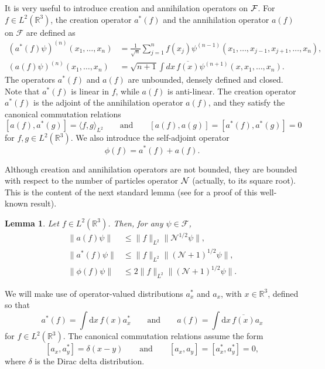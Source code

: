 \documentclass[11pt,a4paper,DIV11]{scrartcl}	%
\newtheorem{lem}[thm]{Lemma}
\newcommand{\cF}{{\cal F}}
\newcommand{\cN}{{\cal N}}
\newcommand{\R}{\mathds{R}}
\newcommand{\N}{\mathcal{N}}
\newcommand{\di}{\textrm{d}}		%
\newcommand{\Ncal}{\mathcal{N}}		%
\newcommand{\cc}[1]{\overline{#1}}	%
\newcommand{\norm}[1]{\lVert#1\rVert}	%
\begin{document}
It is very useful to introduce creation and annihilation operators on $\cF$. 
For $f \in L^2(\R^3)$, the creation operator $a^*(f)$ and the annihilation
operator $a(f)$ on $\mathcal{F}$ are defined as
\[
  \begin{split}
    (a^*(f) \psi)^{(n)}(x_1, \dots, x_n) & = \frac{1}{\sqrt{n}} \sum_{j=1}^n
    f(x_j) \psi^{(n-1)}(x_1, \dots, x_{j-1}, x_{j+1}, \dots, x_n), \\
    (a(f) \psi)^{(n)}(x_1, \dots, x_n) & = \sqrt{n+1} \int dx \,
    \overline{f(x)} \psi^{(n+1)}(x, x_1, \dots, x_n).
  \end{split}
\]
The operators $a^*(f)$ and $a(f)$ are unbounded, densely defined and closed.
Note that $a^*(f)$ is linear in $f$, while $a(f)$ is anti-linear. The creation
operator $a^*(f)$ is the adjoint of the annihilation operator $a(f)$, and
they satisfy the canonical commutation relations
\begin{equation}\label{eq:ccr}
  [a(f), a^*(g)] = \langle f, g \rangle_{L^2} \qquad \text{and} \qquad [a(f),
  a(g)] = [a^*(f), a^*(g)] = 0
\end{equation}
for $f,g \in L^2(\R^3)$. We also introduce the self-adjoint operator
\[
  \phi(f) = a^*(f) + a(f).
\]

Although creation and annihilation operators are not bounded, they are bounded with respect to the number of particles operator $\cN$ (actually, to its square root). This is the content of the next standard lemma (see \cite{RS2009} for a proof of this well-known result).
\begin{lem} \label{l:a}
  Let $f \in L^2(\R^3)$. Then, for any $\psi \in
  \mathcal{F}$,
  \begin{equation} \label{aNorm}
    \begin{aligned}
      \norm{a(f)\psi} & \leq \norm{f}_{L^2} \norm{\Ncal^{1/2}\psi}, \\
      \norm{a^*(f)\psi} & \leq \norm{f}_{L^2} \norm{(\Ncal+1)^{1/2}\psi}, \\
      \norm{\phi(f) \psi} & \leq 2 \norm{f}_{L^2} \norm{(\N+1)^{1/2} \psi}.
    \end{aligned}
  \end{equation}
\end{lem}


We will make use of operator-valued distributions $a_x^*$ and $a_x$, with $x
\in \R^3$, defined so that
\[
  a^*(f) = \int \di x\, f(x) a^*_x \qquad \text{and} \qquad a(f) = \int \di
  x\, \cc{f(x)} a_x
\]
for $f \in L^2(\R^3)$. The canonical commutation
relations assume the form
\[
  [a_x, a_y^*] = \delta(x-y) \qquad \text{and} \qquad [a_x, a_y] = [a_x^*,
  a_y^*] = 0,
\]
where $\delta$ is the Dirac delta distribution.
\end{document}
